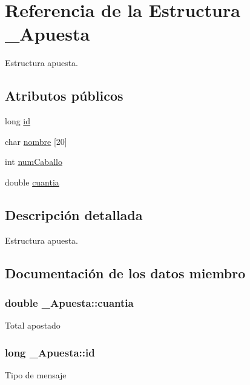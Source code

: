 \hypertarget{struct__Apuesta}{}\section{Referencia de la Estructura \+\_\+\+Apuesta}
\label{struct__Apuesta}


Estructura apuesta.  


\subsection*{Atributos públicos}
\begin{DoxyCompactItemize}
\item 
long \hyperlink{struct__Apuesta_aaa377830ba615faf9c7cb0bdbb8554e5}{id}
\item 
char \hyperlink{struct__Apuesta_ae4d7fe3277098d3c32d34b435408873e}{nombre} \mbox{[}20\mbox{]}
\item 
int \hyperlink{struct__Apuesta_a217a68a637b2db3e61068bafc18ef1ac}{num\+Caballo}
\item 
double \hyperlink{struct__Apuesta_a905f551e1d83b725da8f1e10ab787193}{cuantia}
\end{DoxyCompactItemize}


\subsection{Descripción detallada}
Estructura apuesta. 

\subsection{Documentación de los datos miembro}
\subsubsection[{\texorpdfstring{cuantia}{cuantia}}]{\setlength{\rightskip}{0pt plus 5cm}double \+\_\+\+Apuesta\+::cuantia}\hypertarget{struct__Apuesta_a905f551e1d83b725da8f1e10ab787193}{}\label{struct__Apuesta_a905f551e1d83b725da8f1e10ab787193}
Total apostado 
\subsubsection[{\texorpdfstring{id}{id}}]{\setlength{\rightskip}{0pt plus 5cm}long \+\_\+\+Apuesta\+::id}\hypertarget{struct__Apuesta_aaa377830ba615faf9c7cb0bdbb8554e5}{}\label{struct__Apuesta_aaa377830ba615faf9c7cb0bdbb8554e5}
Tipo de mensaje 
